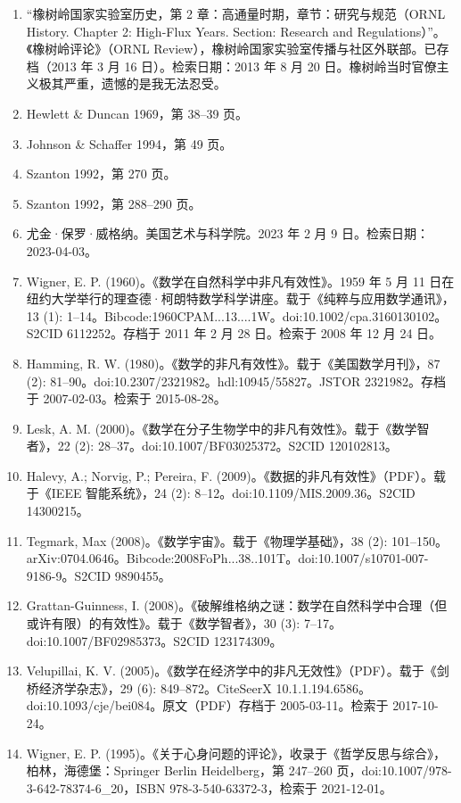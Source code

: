 \begin{enumerate}
\item “橡树岭国家实验室历史，第 2 章：高通量时期，章节：研究与规范（ORNL History. Chapter 2: High-Flux Years. Section: Research and Regulations）”。《橡树岭评论》（ORNL Review），橡树岭国家实验室传播与社区外联部。已存档（2013 年 3 月 16 日）。检索日期：2013 年 8 月 20 日。橡树岭当时官僚主义极其严重，遗憾的是我无法忍受。
\item Hewlett & Duncan 1969，第 38–39 页。
\item Johnson & Schaffer 1994，第 49 页。
\item Szanton 1992，第 270 页。
\item Szanton 1992，第 288–290 页。
\item 尤金·保罗·威格纳。美国艺术与科学院。2023 年 2 月 9 日。检索日期：2023-04-03。
\item Wigner, E. P. (1960)。《数学在自然科学中非凡有效性》。1959 年 5 月 11 日在纽约大学举行的理查德·柯朗特数学科学讲座。载于《纯粹与应用数学通讯》，13 (1): 1–14。Bibcode:1960CPAM...13....1W。doi:10.1002/cpa.3160130102。S2CID 6112252。存档于 2011 年 2 月 28 日。检索于 2008 年 12 月 24 日。
\item Hamming, R. W. (1980)。《数学的非凡有效性》。载于《美国数学月刊》，87 (2): 81–90。doi:10.2307/2321982。hdl:10945/55827。JSTOR 2321982。存档于 2007-02-03。检索于 2015-08-28。
\item Lesk, A. M. (2000)。《数学在分子生物学中的非凡有效性》。载于《数学智者》，22 (2): 28–37。doi:10.1007/BF03025372。S2CID 120102813。
\item Halevy, A.; Norvig, P.; Pereira, F. (2009)。《数据的非凡有效性》（PDF）。载于《IEEE 智能系统》，24 (2): 8–12。doi:10.1109/MIS.2009.36。S2CID 14300215。
\item Tegmark, Max (2008)。《数学宇宙》。载于《物理学基础》，38 (2): 101–150。arXiv:0704.0646。Bibcode:2008FoPh...38..101T。doi:10.1007/s10701-007-9186-9。S2CID 9890455。
\item Grattan-Guinness, I. (2008)。《破解维格纳之谜：数学在自然科学中合理（但或许有限）的有效性》。载于《数学智者》，30 (3): 7–17。doi:10.1007/BF02985373。S2CID 123174309。
\item Velupillai, K. V. (2005)。《数学在经济学中的非凡无效性》（PDF）。载于《剑桥经济学杂志》，29 (6): 849–872。CiteSeerX 10.1.1.194.6586。doi:10.1093/cje/bei084。原文（PDF）存档于 2005-03-11。检索于 2017-10-24。
\item Wigner, E. P. (1995)。《关于心身问题的评论》，收录于《哲学反思与综合》，柏林，海德堡：Springer Berlin Heidelberg，第 247–260 页，doi:10.1007/978-3-642-78374-6\_20，ISBN 978-3-540-63372-3，检索于 2021-12-01。

\end{enumerate}
